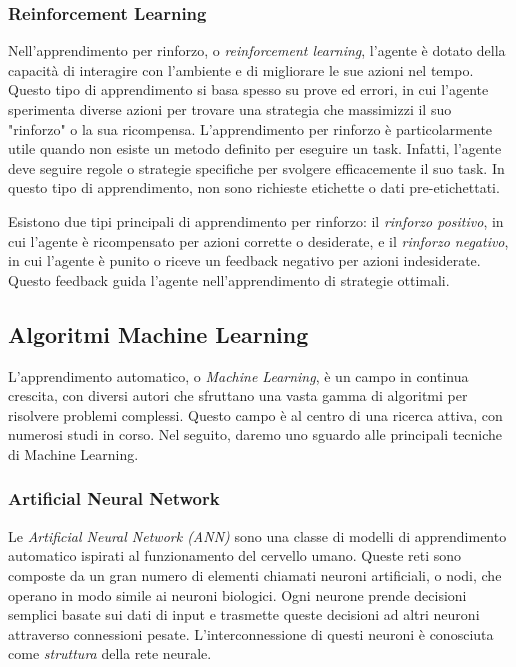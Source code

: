 \subsubsection{Reinforcement Learning}

Nell'apprendimento per rinforzo, o \textit{reinforcement learning}, l'agente è dotato della capacità di interagire con l'ambiente e di migliorare le sue azioni nel tempo. Questo tipo di apprendimento si basa spesso su prove ed errori, in cui l'agente sperimenta diverse azioni per trovare una strategia che massimizzi il suo "rinforzo" o la sua ricompensa. L'apprendimento per rinforzo è particolarmente utile quando non esiste un metodo definito per eseguire un task. Infatti, l'agente deve seguire regole o strategie specifiche per svolgere efficacemente il suo task. In questo tipo di apprendimento, non sono richieste etichette o dati pre-etichettati.

Esistono due tipi principali di apprendimento per rinforzo: il \textit{rinforzo positivo}, in cui l'agente è ricompensato per azioni corrette o desiderate, e il \textit{rinforzo negativo}, in cui l'agente è punito o riceve un feedback negativo per azioni indesiderate. Questo feedback guida l'agente nell'apprendimento di strategie ottimali.

\subsection{Algoritmi Machine Learning}

L'apprendimento automatico, o \textit{Machine Learning}, è un campo in continua crescita, con diversi autori che sfruttano una vasta gamma di algoritmi per risolvere problemi complessi. Questo campo è al centro di una ricerca attiva, con numerosi studi in corso. Nel seguito, daremo uno sguardo alle principali tecniche di Machine Learning.

\subsubsection{Artificial Neural Network}

Le \textit{Artificial Neural Network (ANN)} sono una classe di modelli di apprendimento automatico ispirati al funzionamento del cervello umano. Queste reti sono composte da un gran numero di elementi chiamati neuroni artificiali, o nodi, che operano in modo simile ai neuroni biologici. Ogni neurone prende decisioni semplici basate sui dati di input e trasmette queste decisioni ad altri neuroni attraverso connessioni pesate. L'interconnessione di questi neuroni è conosciuta come \textit{struttura} della rete neurale.

